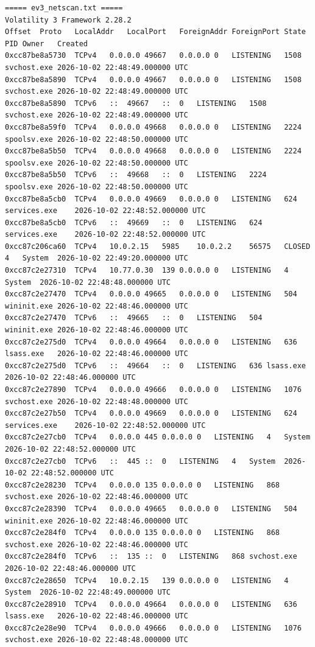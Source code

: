 \documentclass[11pt,letterpaper]{article}
\begin{document}
\begin{lstlisting}
===== ev3_netscan.txt =====
﻿Volatility 3 Framework 2.28.2
Offset	Proto	LocalAddr	LocalPort	ForeignAddr	ForeignPort	State	PID	Owner	Created
0xcc87be8a5730	TCPv4	0.0.0.0	49667	0.0.0.0	0	LISTENING	1508	svchost.exe	2026-10-02 22:48:49.000000 UTC
0xcc87be8a5890	TCPv4	0.0.0.0	49667	0.0.0.0	0	LISTENING	1508	svchost.exe	2026-10-02 22:48:49.000000 UTC
0xcc87be8a5890	TCPv6	::	49667	::	0	LISTENING	1508	svchost.exe	2026-10-02 22:48:49.000000 UTC
0xcc87be8a59f0	TCPv4	0.0.0.0	49668	0.0.0.0	0	LISTENING	2224	spoolsv.exe	2026-10-02 22:48:50.000000 UTC
0xcc87be8a5b50	TCPv4	0.0.0.0	49668	0.0.0.0	0	LISTENING	2224	spoolsv.exe	2026-10-02 22:48:50.000000 UTC
0xcc87be8a5b50	TCPv6	::	49668	::	0	LISTENING	2224	spoolsv.exe	2026-10-02 22:48:50.000000 UTC
0xcc87be8a5cb0	TCPv4	0.0.0.0	49669	0.0.0.0	0	LISTENING	624	services.exe	2026-10-02 22:48:52.000000 UTC
0xcc87be8a5cb0	TCPv6	::	49669	::	0	LISTENING	624	services.exe	2026-10-02 22:48:52.000000 UTC
0xcc87c206ca60	TCPv4	10.0.2.15	5985	10.0.2.2	56575	CLOSED	4	System	2026-10-02 22:49:20.000000 UTC
0xcc87c2e27310	TCPv4	10.77.0.30	139	0.0.0.0	0	LISTENING	4	System	2026-10-02 22:48:48.000000 UTC
0xcc87c2e27470	TCPv4	0.0.0.0	49665	0.0.0.0	0	LISTENING	504	wininit.exe	2026-10-02 22:48:46.000000 UTC
0xcc87c2e27470	TCPv6	::	49665	::	0	LISTENING	504	wininit.exe	2026-10-02 22:48:46.000000 UTC
0xcc87c2e275d0	TCPv4	0.0.0.0	49664	0.0.0.0	0	LISTENING	636	lsass.exe	2026-10-02 22:48:46.000000 UTC
0xcc87c2e275d0	TCPv6	::	49664	::	0	LISTENING	636	lsass.exe	2026-10-02 22:48:46.000000 UTC
0xcc87c2e27890	TCPv4	0.0.0.0	49666	0.0.0.0	0	LISTENING	1076	svchost.exe	2026-10-02 22:48:48.000000 UTC
0xcc87c2e27b50	TCPv4	0.0.0.0	49669	0.0.0.0	0	LISTENING	624	services.exe	2026-10-02 22:48:52.000000 UTC
0xcc87c2e27cb0	TCPv4	0.0.0.0	445	0.0.0.0	0	LISTENING	4	System	2026-10-02 22:48:52.000000 UTC
0xcc87c2e27cb0	TCPv6	::	445	::	0	LISTENING	4	System	2026-10-02 22:48:52.000000 UTC
0xcc87c2e28230	TCPv4	0.0.0.0	135	0.0.0.0	0	LISTENING	868	svchost.exe	2026-10-02 22:48:46.000000 UTC
0xcc87c2e28390	TCPv4	0.0.0.0	49665	0.0.0.0	0	LISTENING	504	wininit.exe	2026-10-02 22:48:46.000000 UTC
0xcc87c2e284f0	TCPv4	0.0.0.0	135	0.0.0.0	0	LISTENING	868	svchost.exe	2026-10-02 22:48:46.000000 UTC
0xcc87c2e284f0	TCPv6	::	135	::	0	LISTENING	868	svchost.exe	2026-10-02 22:48:46.000000 UTC
0xcc87c2e28650	TCPv4	10.0.2.15	139	0.0.0.0	0	LISTENING	4	System	2026-10-02 22:48:49.000000 UTC
0xcc87c2e28910	TCPv4	0.0.0.0	49664	0.0.0.0	0	LISTENING	636	lsass.exe	2026-10-02 22:48:46.000000 UTC
0xcc87c2e28e90	TCPv4	0.0.0.0	49666	0.0.0.0	0	LISTENING	1076	svchost.exe	2026-10-02 22:48:48.000000 UTC

\end{lstlisting}
\end{document}

